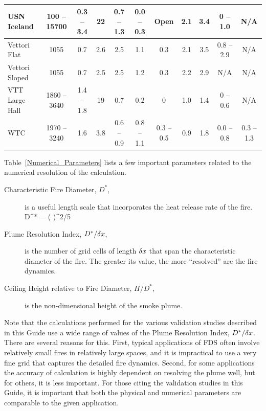 \begin{landscape}
\begin{longtable}{|l|c|c|c|c|c|c|c|c|c|c|}
USN Iceland         & 100 -- 15700  & 0.3 -- 3.4    & 22    & 0.7 -- 1.3        & 0.0 -- 0.3          & Open          & 2.1         & 3.4         & 0 -- 1.0              & N/A                   \\ \hline
Vettori Flat        & 1055          & 0.7           & 2.6   & 2.5               & 1.1                 & 0.3           & 2.1         & 3.5         & 0.8 -- 2.9            & N/A                   \\ \hline
Vettori Sloped      & 1055          & 0.7           & 2.5   & 2.5               & 1.2                 & 0.3           & 2.2         & 2.9         & N/A                   & N/A                   \\ \hline
VTT Large Hall      & 1860 -- 3640  & 1.4 -- 1.8    & 19    & 0.7               & 0.2                 & 0             & 1.0         & 1.4         & 0 -- 0.6              & N/A                   \\ \hline
WTC                 & 1970 -- 3240  & 1.6           & 3.8   & 0.6 -- 0.9        & 0.8 -- 1.1          & 0.3 -- 0.5    & 0.9         & 1.8         & 0.0 -- 0.8            & 0.3 -- 1.3            \\ \hline
\end{longtable}
\end{landscape}


\FloatBarrier

Table~\ref{Numerical_Parameters} lists a few important parameters related to the numerical resolution of the calculation.
\begin{description}
\item[Characteristic Fire Diameter, $D^*$,] is a useful length scale that incorporates the heat release rate of the fire.
\be D^* = \left(  \right)^{2/5}  \ee
\item[Plume Resolution Index, $D^*/\delta x$,] is the number of grid cells of length $\delta x$ that span the characteristic diameter of the fire. The greater its value, the more ``resolved'' are the fire dynamics.
\item[Ceiling Height relative to Fire Diameter, $H/D^*$,] is the non-dimensional height of the smoke plume.
\end{description}
Note that the calculations performed for the various validation studies described in this Guide use a wide range of values of the Plume Resolution Index, $D^*/\delta x$. There are several reasons for this. First, typical applications of FDS often involve relatively small fires in relatively large spaces, and it is impractical to use a very fine grid that captures the detailed fire dynamics. Second, for some applications the accuracy of calculation is highly dependent on resolving the plume well, but for others, it is less important. For those citing the validation studies in this Guide, it is important that both the physical and numerical parameters are comparable to the given application.

